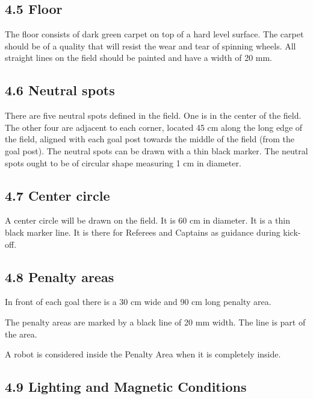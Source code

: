 \documentclass{article}
\begin{document}
\subsection{4.5 Floor \label{ref-033}}

The floor consists of \textcolor{color-5}{dark} green carpet on top of a hard level surface. The carpet should be of a quality that will resist the wear and tear of spinning wheels. All straight lines on the field should be painted and have a width of 20 mm.

\subsection{4.6 Neutral spots \label{ref-034}}

There are five neutral spots defined in the field. One is in the center of the field. The other four are adjacent to each corner, located 45 cm along the long edge of the field, aligned with each goal post towards the middle of the field (from the goal post). The neutral spots can be drawn with a thin black marker. The neutral spots ought to be of circular shape measuring 1 cm in diameter.

\subsection{4.7 Center circle \label{ref-035}}

A center circle will be drawn on the field. It is 60 cm in diameter. It is a thin black marker line. It is there for Referees and Captains as guidance during kick-off. 

\subsection{4.8 Penalty areas \label{ref-036}}

In front of each goal there is a 30 cm wide and 90 cm long penalty area. 

The penalty areas are marked by a black line of 20 mm width. The line is part of the area. 

A robot is considered inside the Penalty Area when it is completely inside. 

\textbf{}

\subsection{4.9 Lighting and Magnetic Conditions \label{ref-037}}
\end{document}
